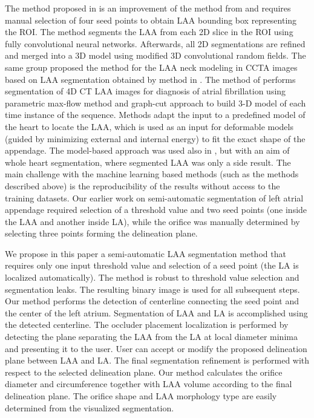 \documentclass[review]{elsarticle}
\begin{document}
The method proposed in \cite{jin2018_LeftAtrialAppendage} is an improvement of
the method from \cite{wang2016_LeftAtrialAppendage} and requires manual
selection of four seed points to obtain LAA bounding box representing the ROI.
The method segments the LAA from each 2D slice in the ROI using fully
convolutional neural networks. Afterwards, all 2D segmentations are refined and
merged into a 3D model using modified 3D convolutional random fields. 
The same group proposed the method for the LAA neck modeling in CCTA images
\cite{jin2017_LeftAtrialAppendage} based on LAA segmentation obtained by method
in \cite{wang2016_LeftAtrialAppendage}.  The method of
\cite{jin2018_Leftatrialappendagea} performs segmentation of 4D CT LAA images
for diagnosis of atrial fibrillation using parametric max-flow method and
graph-cut approach to build 3-D model of each time instance of the sequence.
Methods
\cite{grasland-mongrain2009_Segmentationleftatrial,grasland-mongrain2010_Combinationshapeconstrainedinflation}
adapt the input to a predefined model of the heart to locate the LAA, which is
used as an input for deformable models (guided by minimizing external and
internal energy) to fit the exact shape of the appendage.  The model-based
approach was used also in
\cite{zhong2012_Segmentationremovalpulmonary,zhong2013_Automaticheartisolation},
but with an aim of whole heart segmentation, where segmented LAA was only a
side result. 
The main challenge with the machine learning based methods (such as the methods described 
above) is the reproducibility of the results without access to the training
datasets.
Our earlier work on semi-automatic segmentation of left atrial appendage
\cite{leventic2017_SemiautomaticLeftAtrial} required selection of a threshold
value and two seed points (one inside the LAA and another inside LA), while the
orifice was manually determined by selecting three points forming the
delineation plane.


We propose in this paper a semi-automatic LAA segmentation method that requires
only one input threshold value and selection of a seed point (the LA is
localized automatically). The method is robust to threshold value selection and
segmentation leaks. 
The resulting binary image is used for all subsequent steps. 
Our method performs the detection of centerline
connecting the seed point and the center of the left atrium. Segmentation of
LAA and LA is accomplished using the detected centerline. The occluder
placement localization is performed by detecting the plane separating the LAA
from the LA at local diameter minima and presenting it to the user. User can
accept or modify the proposed delineation plane between LAA and LA. The final
segmentation refinement is performed with respect to the selected delineation
plane. Our method calculates the orifice diameter and circumference together
with LAA volume according to the final delineation plane. The orifice shape and
LAA morphology type are easily determined from the visualized segmentation.
\end{document}
